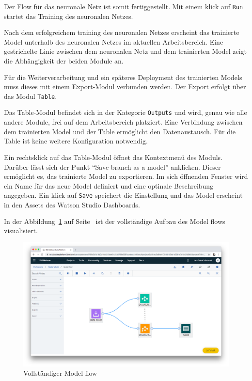 Der Flow für das neuronale Netz ist somit fertiggestellt. Mit einem klick auf \texttt{Run} startet das Training des
neuronalen Netzes.

Nach dem erfolgreichem training des neuronalen Netzes erscheint das trainierte Model unterhalb des neuronalen Netzes im
aktuellen Arbeitsbereich. Eine gestrichelte Linie zwischen dem neuronalen Netz und dem trainierten Model zeigt die
Abhängigkeit der beiden Module an.

Für die Weiterverarbeitung und ein späteres Deployment des trainierten Models muss dieses mit einem Export-Modul verbunden
werden. Der Export erfolgt über das Modul \texttt{Table}.

Das Table-Modul befindet sich in der Kategorie \texttt{Outputs} und wird, genau wie alle andere Module, frei auf dem
Arbeitsbereich platziert. Eine Verbindung zwischen dem trainierten Model und der Table ermöglicht den Datenaustausch.
Für die Table ist keine weitere Konfiguration notwendig.

Ein rechtsklick auf das Table-Modul öffnet das Kontextmenü des Moduls. Darüber lässt sich der Punkt
\enquote{Save branch as a model} anklicken. Dieser ermöglicht es, das trainierte Model zu exportieren. Im sich öffnenden
Fenster wird ein Name für das neue Model definiert und eine optinale Beschreibung angegeben. Ein klick auf \texttt{Save}
speichert die Einstellung und das Model erscheint in den Assets des Watson Studio Dashboards.

In der Abbildung~\ref{fig:umsetzung_model_flow} auf Seite~\pageref{fig:umsetzung_model_flow} ist der vollständige Aufbau
des Model flows visualisiert.

\begin{figure}[h]
    \centering
    \includegraphics[scale=0.26]{images/kapitel_3/umsetzung_model_flow.png}
    \caption{Vollständiger Model flow}
    \label{fig:umsetzung_model_flow}
\end{figure}

